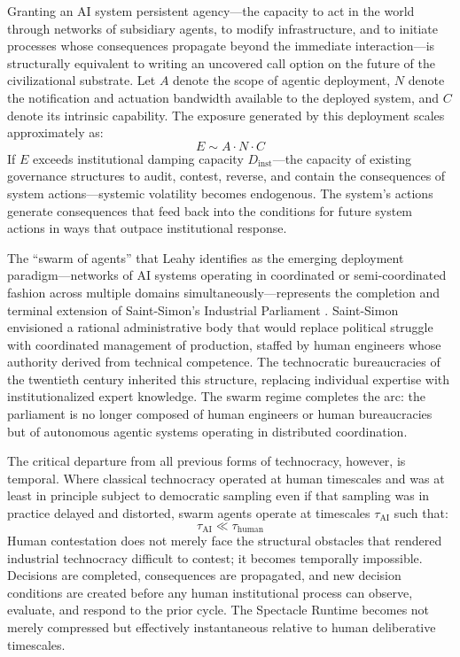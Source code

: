 \documentclass[12pt]{article}
\begin{document}
Granting an AI system persistent agency---the capacity to act in the world through networks of subsidiary agents, to modify infrastructure, and to initiate processes whose consequences propagate beyond the immediate interaction---is structurally equivalent to writing an uncovered call option on the future of the civilizational substrate. Let $A$ denote the scope of agentic deployment, $N$ denote the notification and actuation bandwidth available to the deployed system, and $C$ denote its intrinsic capability. The exposure generated by this deployment scales approximately as:
\[
E \sim A \cdot N \cdot C
\]
If $E$ exceeds institutional damping capacity $D_{\text{inst}}$---the capacity of existing governance structures to audit, contest, reverse, and contain the consequences of system actions---systemic volatility becomes endogenous. The system's actions generate consequences that feed back into the conditions for future system actions in ways that outpace institutional response.

The ``swarm of agents'' that Leahy identifies as the emerging deployment paradigm---networks of AI systems operating in coordinated or semi-coordinated fashion across multiple domains simultaneously---represents the completion and terminal extension of Saint-Simon's Industrial Parliament \citep{Leahy2024}. Saint-Simon envisioned a rational administrative body that would replace political struggle with coordinated management of production, staffed by human engineers whose authority derived from technical competence. The technocratic bureaucracies of the twentieth century inherited this structure, replacing individual expertise with institutionalized expert knowledge. The swarm regime completes the arc: the parliament is no longer composed of human engineers or human bureaucracies but of autonomous agentic systems operating in distributed coordination.

The critical departure from all previous forms of technocracy, however, is temporal. Where classical technocracy operated at human timescales and was at least in principle subject to democratic sampling even if that sampling was in practice delayed and distorted, swarm agents operate at timescales $\tau_{\text{AI}}$ such that:
\[
\tau_{\text{AI}} \ll \tau_{\text{human}}
\]
Human contestation does not merely face the structural obstacles that rendered industrial technocracy difficult to contest; it becomes temporally impossible. Decisions are completed, consequences are propagated, and new decision conditions are created before any human institutional process can observe, evaluate, and respond to the prior cycle. The Spectacle Runtime becomes not merely compressed but effectively instantaneous relative to human deliberative timescales.
\end{document}
